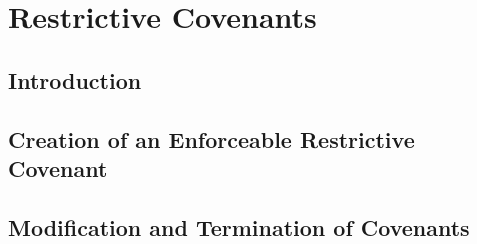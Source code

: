 \chapter{Restrictive Covenants}


\section{Introduction}





\begin{questions}

\end{questions}



\section{Creation of an Enforceable Restrictive Covenant}






\begin{questions}

\end{questions}



\begin{questions}

\end{questions}




\begin{questions}

\end{questions}

\section{Modification and Termination of Covenants}







\begin{questions}

\end{questions}
\endinput
